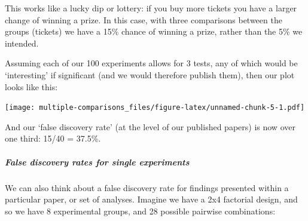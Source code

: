 \documentclass[]{article}
\let\oldsubparagraph\subparagraph
\renewcommand{\subparagraph}[1]{\oldsubparagraph{#1}\mbox{}}
\theoremstyle{definition}
\theoremstyle{definition}
\theoremstyle{definition}
\theoremstyle{remark}
\begin{document}
This works like a lucky dip or lottery: if you buy more tickets you have
a larger change of winning a prize. In this case, with three comparisons
between the groups (tickets) we have a 15\% chance of winning a prize,
rather than the 5\% we intended.

Assuming each of our 100 experiments allows for 3 tests, any of which
would be `interesting' if significant (and we would therefore publish
them), then our plot looks like this:

\texttt{[image: multiple-comparisons\_files/figure-latex/unnamed-chunk-5-1.pdf]}

And our `false discovery rate' (at the level of our published papers) is
now over one third: 15/40 = 37.5\%.

\subparagraph{False discovery rates for single
experiments}\label{false-discovery-rates-for-single-experiments}

We can also think about a false discovery rate for findings presented
within a particular paper, or set of analyses. Imagine we have a 2x4
factorial design, and so we have 8 experimental groups, and 28 possible
pairwise combinations:
\end{document}

